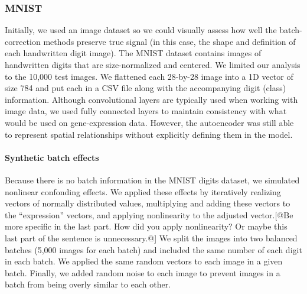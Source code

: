 
\subsubsection{MNIST}

Initially, we used an image dataset so we could visually assess how well the batch-correction methods preserve true signal (in this case, the shape and definition of each handwritten digit image).
The MNIST dataset \cite{lecun_mnist_nodate} contains images of handwritten digits that are size-normalized and centered.
We limited our analysis to the 10,000 test images.
We flattened each 28-by-28 image into a 1D vector of size 784 and put each in a CSV file along with the accompanying digit (class) information.
Although convolutional layers are typically used when working with image data, we used fully connected layers to maintain consistency with what would be used on gene-expression data.
However, the autoencoder was still able to represent spatial relationships without explicitly defining them in the model.

\paragraph{Synthetic batch effects}

Because there is no batch information in the MNIST digits dataset, we simulated nonlinear confonding effects.
We applied these effects by iteratively realizing vectors of normally distributed values, multiplying and adding these vectors to the ``expression'' vectors, and applying nonlinearity to the adjusted vector.[@Be more specific in the last part. How did you apply nonlinearity? Or maybe this last part of the sentence is unnecessary.@]
We split the images into two balanced batches (5,000 images for each batch) and included the same number of each digit in each batch.
We applied the same random vectors to each image in a given batch.
Finally, we added random noise to each image to prevent images in a batch from being overly similar to each other.

